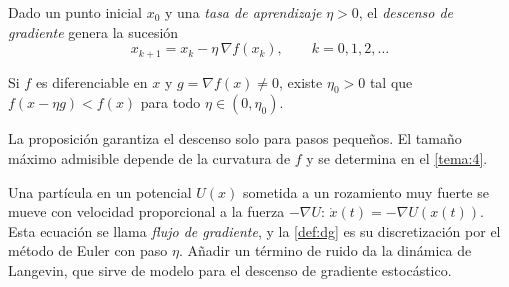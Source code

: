 \begin{definicion}\label{def:dg}
Dado un punto inicial $x_0$ y una \emph{tasa de aprendizaje} $\eta>0$, el \emph{descenso de gradiente} genera la sucesión
\[
x_{k+1}=x_k-\eta\,\nabla f(x_k),\qquad k=0,1,2,\dots
\]
\end{definicion}

\begin{proposicion}\label{prop:descenso}
Si $f$ es diferenciable en $x$ y $g=\nabla f(x)\ne 0$, existe $\eta_0>0$ tal que $f(x-\eta g)<f(x)$ para todo $\eta\in(0,\eta_0)$.
\end{proposicion}

La proposición garantiza el descenso solo para pasos pequeños. El tamaño máximo admisible depende de la curvatura de $f$ y se determina en el \cref{tema:4}.

\addtocounter{definicion}{1}%

\addtocounter{definicion}{1}%

\begin{observacion}
Una partícula en un potencial $U(x)$ sometida a un rozamiento muy fuerte se mueve con velocidad proporcional a la fuerza $-\nabla U$: $\dot x(t)=-\nabla U(x(t))$. Esta ecuación se llama \emph{flujo de gradiente}, y la \cref{def:dg} es su discretización por el método de Euler con paso $\eta$. Añadir un término de ruido da la dinámica de Langevin, que sirve de modelo para el descenso de gradiente estocástico.
\end{observacion}

